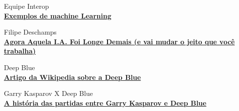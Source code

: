 \documentclass[12pt]{article}
\begin{document}
    \begin{thebibliography}{4}
        Equipe Interop \\
        \href{https://www.interop.com.br/blog/exemplos-de-machine-learning/}{\textbf{Exemplos de machine Learning}} 
        
        Filipe Deschamps \\
        \href{https://www.interop.com.br/blog/exemplos-de-machine-learning/}{\textbf{Agora Aquela I.A. Foi Longe Demais (e vai mudar o jeito que você trabalha)}}

        Deep Blue \\
        \href{https://pt.wikipedia.org/wiki/Deep_Blue}{\textbf{Artigo da Wikipedia sobre a Deep Blue}}
        
        Garry Kasparov X Deep Blue \\
        \href{https://pt.wikipedia.org/wiki/Deep_Blue}{\textbf{A história das partidas entre Garry Kasparov e Deep Blue}}
    \end{thebibliography}

    
\end{document}
